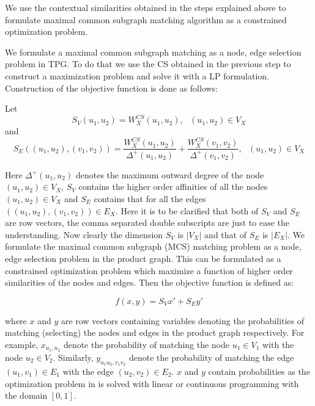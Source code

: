 We use the contextual similarities obtained in the steps explained above to formulate maximal common subgraph matching algorithm as a constrained optimization problem.

We formulate a maximal common subgraph matching as a node, edge selection problem in TPG. To do that we use the CS obtained in the previous step to construct a maximization problem and solve it with a LP formulation. Construction of the objective function is done as follows:

Let
\[
S_V(u_1,u_2) = W^{CS}_X(u_1,u_2),\text{  }(u_1,u_2)\in V_X
\]
and
\[
S_E((u_1,u_2),(v_1,v_2)) = \frac{W^{CS}_X(u_1,u_2)}{\Delta^+(u_1,u_2)}+\frac{W^{CS}_X(v_1,v_2)}{\Delta^+(v_1,v_2)},\text{  }(u_1,u_2)\in V_X
\]

Here $\Delta^+(u_1,u_2)$ denotes the maximum outward degree of the node $(u_1,u_2)\in V_X$, $S_V$ contains the higher order affinities of all the nodes $(u_1,u_2)\in V_X$ and $S_E$ contains that for all the edges $((u_1,u_2),(v_1,v_2))\in E_X$. Here it is to be clarified that both of $S_V$ and $S_E$ are row vectors, the comma separated double subscripts are just to ease the understanding. Now clearly the dimension $S_V$ is $|V_X|$ and that of $S_E$ is $|E_X|$. We formulate the maximal common subgraph (MCS) matching problem as a node, edge selection problem in the product graph. This can be formulated as a constrained optimization problem which maximize a function of higher order similarities of the nodes and edges. Then the objective function is defined as:

\begin{equation}
f(x,y) = S_Vx'+S_Ey'
\label{eqn:pg:optm}
\end{equation}

where $x$ and $y$ are row vectors containing variables denoting the probabilities of matching (selecting) the nodes and edges in the product graph respectively. For example, $x_{u_1,u_2}$ denote the probability of matching the node $u_1\in V_1$ with the node $u_2\in V_2$. Similarly, $y_{u_1u_2,v_1v_2}$ denote the probability of matching the edge $(u_1,v_1)\in E_1$ with the edge $(u_2,v_2)\in E_2$. $x$ and $y$ contain probabilities as the optimization problem in  is solved with linear or continuous programming with the domain $[0,1]$.

